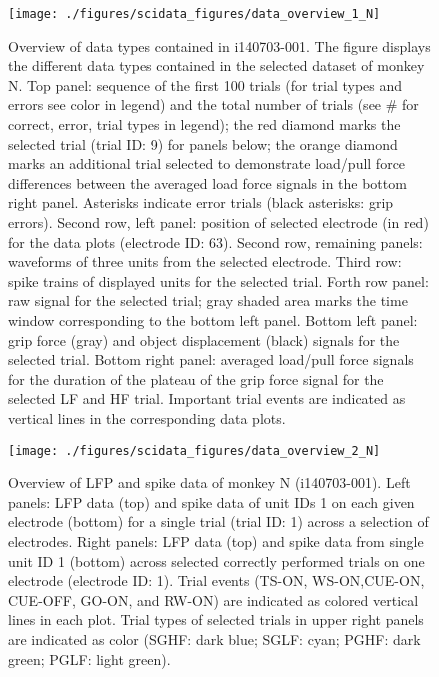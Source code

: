 {\begin{figure}
 \texttt{[image: ./figures/scidata\_figures/data\_overview\_1\_N]}
 \caption[Overview of data types contained in i140703-001]{Overview of data types contained in i140703-001. The figure displays the different data types contained in the selected dataset of monkey N. Top panel: sequence of the first 100 trials (for trial types and errors see color in legend) and the total number of trials (see \# for correct, error, trial types in legend); the red diamond marks the selected trial (trial ID: 9) for panels below; the orange diamond marks an additional trial selected to demonstrate load/pull force differences between the averaged load force signals in the bottom right panel. Asterisks indicate error trials (black asterisks: grip errors). Second row, left panel: position of selected electrode (in red) for the data plots (electrode ID: 63). Second row, remaining panels: waveforms of three units from the selected electrode. Third row: spike trains of displayed units for the selected trial. Forth row panel: raw signal for the selected trial; gray shaded area marks the time window corresponding to the bottom left panel. Bottom left panel: grip force (gray) and object displacement (black) signals for the selected trial. Bottom right panel: averaged load/pull force signals for the duration of the plateau of the grip force signal for the selected LF and HF trial. Important trial events are indicated as vertical lines in the corresponding data plots.}
 \label{fig:overview_data_n_1}
\end{figure}

\begin{figure}
 \texttt{[image: ./figures/scidata\_figures/data\_overview\_2\_N]}
 \caption[Overview of LFP and spike data of monkey N (i140703-001)]{Overview of LFP and spike data of monkey N (i140703-001). Left panels: LFP data (top) and spike data of unit IDs 1 on each given electrode (bottom) for a single trial (trial ID: 1) across a selection of electrodes. Right panels: LFP data (top) and spike data from single unit ID 1 (bottom) across selected correctly performed trials on one electrode (electrode ID: 1). Trial events (TS-ON, WS-ON,CUE-ON, CUE-OFF, GO-ON, and RW-ON) are indicated as colored vertical lines in each plot. Trial types of selected trials in upper right panels are indicated as color (SGHF: dark blue; SGLF: cyan; PGHF: dark green; PGLF: light green).}
 \label{fig:overview_data_n_2}
\end{figure}


}
